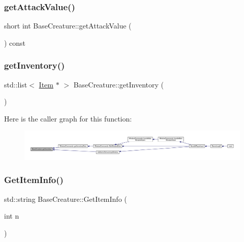 \subsubsection{\texorpdfstring{get\+Attack\+Value()}{getAttackValue()}}
{\footnotesize\ttfamily short int Base\+Creature\+::get\+Attack\+Value (\begin{DoxyParamCaption}{ }\end{DoxyParamCaption}) const}

\mbox{\label{class_base_creature_a505e70415a3e2db87aac0767498375ff}} 
\subsubsection{\texorpdfstring{get\+Inventory()}{getInventory()}}
{\footnotesize\ttfamily std\+::list$<$ \mbox{\hyperlink{class_item}{Item}} $\ast$ $>$ Base\+Creature\+::get\+Inventory (\begin{DoxyParamCaption}{ }\end{DoxyParamCaption})}

Here is the caller graph for this function\+:
\nopagebreak
\begin{figure}[H]
\begin{center}
\leavevmode
\includegraphics[width=350pt]{class_base_creature_a505e70415a3e2db87aac0767498375ff_icgraph}
\end{center}
\end{figure}
\mbox{\label{class_base_creature_a19f380cccb11f31d10d00de934da1b7f}} 
\subsubsection{\texorpdfstring{Get\+Item\+Info()}{GetItemInfo()}}
{\footnotesize\ttfamily std\+::string Base\+Creature\+::\+Get\+Item\+Info (\begin{DoxyParamCaption}\item[{int}]{n }\end{DoxyParamCaption})}

